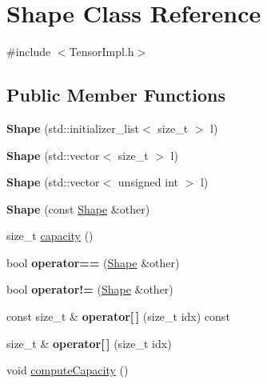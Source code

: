 \hypertarget{classShape}{}\section{Shape Class Reference}
\label{classShape}


{\ttfamily \#include $<$Tensor\+Impl.\+h$>$}

\subsection*{Public Member Functions}
\begin{DoxyCompactItemize}
\item 
\mbox{\label{classShape_a1dccd978da66abee047a9bf1fc785301}} 
{\bfseries Shape} (std\+::initializer\+\_\+list$<$ size\+\_\+t $>$ l)
\item 
\mbox{\label{classShape_a14bcfae8246987eb3e769dfa202453ec}} 
{\bfseries Shape} (std\+::vector$<$ size\+\_\+t $>$ l)
\item 
\mbox{\label{classShape_a02ecca3348f398577dbe72c6c0654b83}} 
{\bfseries Shape} (std\+::vector$<$ unsigned int $>$ l)
\item 
\mbox{\label{classShape_af929eaa4d0cbd6b2fe2e9026796b9cae}} 
{\bfseries Shape} (const \hyperlink{classShape}{Shape} \&other)
\item 
size\+\_\+t \hyperlink{classShape_ad6b6d852da0d07a2423e86b4ef5ad546}{capacity} ()
\item 
\mbox{\label{classShape_abec858b84a1ffedfd1124a08c3be5f1f}} 
bool {\bfseries operator==} (\hyperlink{classShape}{Shape} \&other)
\item 
\mbox{\label{classShape_a2cdad1c0f6eb8e14d759fb48ad192939}} 
bool {\bfseries operator!=} (\hyperlink{classShape}{Shape} \&other)
\item 
\mbox{\label{classShape_a4723009a6d66ab16276746e214d03f10}} 
const size\+\_\+t \& {\bfseries operator\mbox{[}$\,$\mbox{]}} (size\+\_\+t idx) const
\item 
\mbox{\label{classShape_a351c54bd811d932882ee58332376e837}} 
size\+\_\+t \& {\bfseries operator\mbox{[}$\,$\mbox{]}} (size\+\_\+t idx)
\item 
void \hyperlink{classShape_aac6c0ddc8b96c70e0e138c5ba1e70ec4}{compute\+Capacity} ()
\end{DoxyCompactItemize}
